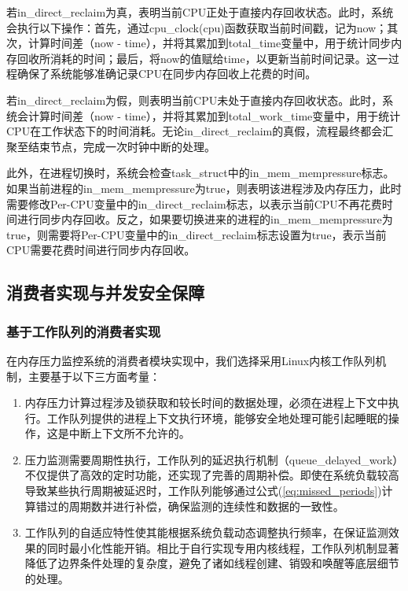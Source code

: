 若in\_direct\_reclaim为真，表明当前CPU正处于直接内存回收状态。此时，系统会执行以下操作：首先，通过cpu\_clock(cpu)函数获取当前时间戳，记为now；其次，计算时间差（now - time），并将其累加到total\_time变量中，用于统计同步内存回收所消耗的时间；最后，将now的值赋给time，以更新当前时间记录。这一过程确保了系统能够准确记录CPU在同步内存回收上花费的时间。

若in\_direct\_reclaim为假，则表明当前CPU未处于直接内存回收状态。此时，系统会计算时间差（now - time），并将其累加到total\_work\_time变量中，用于统计CPU在工作状态下的时间消耗。无论in\_direct\_reclaim的真假，流程最终都会汇聚至结束节点，完成一次时钟中断的处理。


此外，在进程切换时，系统会检查task\_struct中的in\_mem\_mempressure标志。如果当前进程的in\_mem\_mempressure为true，则表明该进程涉及内存压力，此时需要修改Per-CPU变量中的in\_direct\_reclaim标志，以表示当前CPU不再花费时间进行同步内存回收。反之，如果要切换进来的进程的in\_mem\_mempressure为true，则需要将Per-CPU变量中的in\_direct\_reclaim标志设置为true，表示当前CPU需要花费时间进行同步内存回收。

\subsection{消费者实现与并发安全保障}
\label{sec:consumer_implementation}

\subsubsection{基于工作队列的消费者实现}
\label{sec:工作队列}
在内存压力监控系统的消费者模块实现中，我们选择采用Linux内核工作队列机制，主要基于以下三方面考量：
\begin{enumerate}
    \item 内存压力计算过程涉及锁获取和较长时间的数据处理，必须在进程上下文中执行。工作队列提供的进程上下文执行环境，能够安全地处理可能引起睡眠的操作，这是中断上下文所不允许的。
    \item 压力监测需要周期性执行，工作队列的延迟执行机制（queue\_delayed\_work）不仅提供了高效的定时功能，还实现了完善的周期补偿。即使在系统负载较高导致某些执行周期被延迟时，工作队列能够通过公式(\ref{eq:missed_periods})计算错过的周期数并进行补偿，确保监测的连续性和数据的一致性。
    \item 工作队列的自适应特性使其能根据系统负载动态调整执行频率，在保证监测效果的同时最小化性能开销。相比于自行实现专用内核线程，工作队列机制显著降低了边界条件处理的复杂度，避免了诸如线程创建、销毁和唤醒等底层细节的处理。
\end{enumerate}

